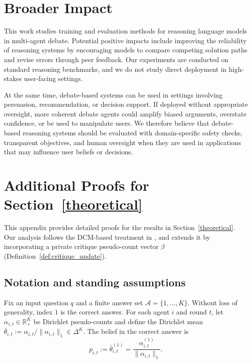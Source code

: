 \section{Broader Impact}
\label{app:broader_impact}

This work studies training and evaluation methods for reasoning language models in multi-agent debate. Potential positive impacts include improving the reliability of reasoning systems by encouraging models to compare competing solution paths and revise errors through peer feedback. Our experiments are conducted on standard reasoning benchmarks, and we do not study direct deployment in high-stakes user-facing settings.

At the same time, debate-based systems can be used in settings involving persuasion, recommendation, or decision support. If deployed without appropriate oversight, more coherent debate agents could amplify biased arguments, overstate confidence, or be used to manipulate users. We therefore believe that debate-based reasoning systems should be evaluated with domain-specific safety checks, transparent objectives, and human oversight when they are used in applications that may influence user beliefs or decisions.

\section{Additional Proofs for Section~\ref{theoretical}}
\label{app:theory_proofs}

This appendix provides detailed proofs for the results in Section~\ref{theoretical}.
Our analysis follows the DCM-based treatment in \citet{choi2025debate}, and extends it by incorporating
a private critique pseudo-count vector \(\beta\) (Definition~\ref{def:critique_update}).

\subsection{Notation and standing assumptions}
\label{app:notation}

Fix an input question \(q\) and a finite answer set \(\mathcal{A}=\{1,\dots,K\}\). Without loss of generality,
index \(1\) is the correct answer. For each agent \(i\) and round \(t\), let
\(\alpha_{i,t}\in\mathbb{R}^K_+\) be Dirichlet pseudo-counts and define the Dirichlet mean
\(\bar\theta_{i,t}:=\alpha_{i,t}/\|\alpha_{i,t}\|_1\in\Delta^K\).
The belief in the correct answer is
\[
p_{i,t} := \bar\theta^{(1)}_{i,t} = \frac{\alpha^{(1)}_{i,t}}{\|\alpha_{i,t}\|_1}.
\]

